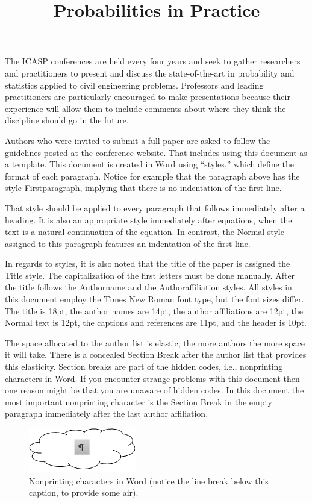 \documentclass{ICASP13Paper}
\title{Probabilities in Practice}
\begin{document}
The ICASP conferences are held every four years and seek to gather researchers 
and practitioners to present and discuss the state-of-the-art in probability 
and statistics applied to civil engineering problems. Professors and leading 
practitioners are particularly encouraged to make presentations because their 
experience will allow them to include comments about where they think the 
discipline should go in the future.
\par
Authors who were invited to submit a full paper are asked to follow the 
guidelines posted at the conference website. That includes using this document 
as a template. This document is created in Word using “styles,” which define 
the format of each paragraph. Notice for example that the paragraph above has 
the style Firstparagraph, implying that there is no indentation of the first 
line.
\par
That style should be applied to every paragraph that follows immediately after 
a heading. It is also an appropriate style immediately after equations, when 
the text is a natural continuation of the equation. In contrast, the Normal 
style assigned to this paragraph features an indentation of the first line.
\par 
In regards to styles, it is also noted that the title of the paper is assigned 
the Title style. The capitalization of the first letters must be done manually. 
After the title follows the Authorname and the Authoraffiliation styles. All 
styles in this document employ the Times New Roman font type, but the font 
sizes differ. The title is 18pt, the author names are 14pt, the author 
affiliations are 12pt, the Normal text is 12pt, the captions and references are 
11pt, and the header is 10pt.
\par
The space allocated to the author list is elastic; the more authors the more 
space it will take. There is a concealed Section Break after the author list 
that provides this elasticity. Section breaks are part of the hidden codes, 
i.e., nonprinting characters in Word. If you encounter strange problems with 
this document then one reason might be that you are unaware of hidden codes. In 
this document the most important nonprinting character is the Section Break in 
the empty paragraph immediately after the last author affiliation.
\begin{figure}[h!]
  \centering
  \includegraphics[scale=0.6]{Cloud}
  \caption{Nonprinting characters in Word (notice the line break below this 
  caption, to provide some air). }
  \label{fig:label}
\end{figure}  
\end{document}
